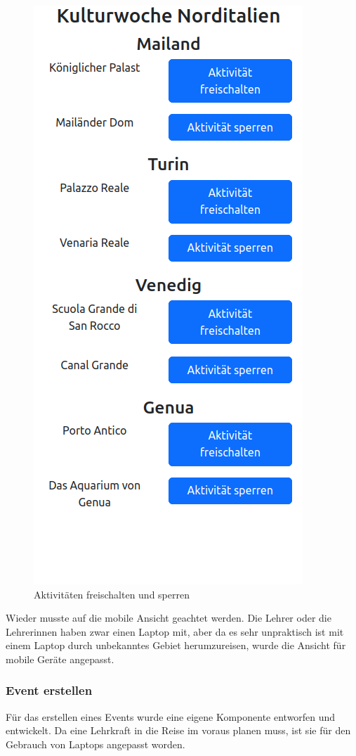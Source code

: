 \begin{figure}[h]
    \centering
    \includegraphics[scale=0.8]{pics/unlock-activity.png}
    \caption{Aktivitäten freischalten und sperren}
    \label{lst:UnlockActivity}
\end{figure}

Wieder musste auf die mobile Ansicht geachtet werden. Die Lehrer oder die Lehrerinnen haben zwar einen Laptop mit, aber da es sehr unpraktisch ist mit einem Laptop durch unbekanntes Gebiet herumzureisen, wurde die Ansicht für mobile Geräte angepasst. 

\subsubsection{Event erstellen}
Für das erstellen eines Events wurde eine eigene Komponente entworfen und entwickelt. Da eine Lehrkraft in die Reise im voraus planen muss, ist sie für den Gebrauch von Laptops angepasst worden.

